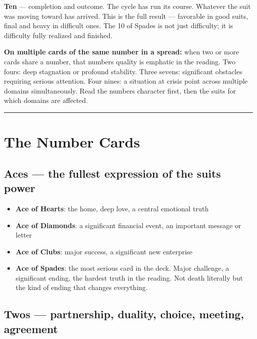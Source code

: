 \textbf{Ten} --- completion and outcome. The cycle has run its course. Whatever the suit was moving toward has arrived. This is the full result --- favorable in good suits, final and heavy in difficult ones. The 10 of Spades is not just difficulty; it is difficulty fully realized and finished.

\textbf{On multiple cards of the same number in a spread:} when two or more cards share a number, that number\textquotesingle s quality is emphatic in the reading. Two fours: deep stagnation or profound stability. Three sevens: significant obstacles requiring serious attention. Four nines: a situation at crisis point across multiple domains simultaneously. Read the number\textquotesingle s character first, then the suits for which domains are affected.

\begin{center}\rule{0.5\linewidth}{0.5pt}\end{center}

\section{The Number Cards}\label{the-number-cards}

\subsection{Aces --- the fullest expression of the suit\textquotesingle s power}\label{aces--the-fullest-expression-of-the-suits-power}

\begin{itemize}
\tightlist
\item
  \textbf{Ace of Hearts}: the home, deep love, a central emotional truth
\item
  \textbf{Ace of Diamonds}: a significant financial event, an important message or letter
\item
  \textbf{Ace of Clubs}: major success, a significant new enterprise
\item
  \textbf{Ace of Spades}: the most serious card in the deck. Major challenge, a significant ending, the hardest truth in the reading. Not death literally but the kind of ending that changes everything.
\end{itemize}

\subsection{Twos --- partnership, duality, choice, meeting, agreement}\label{twos--partnership-duality-choice-meeting-agreement}

